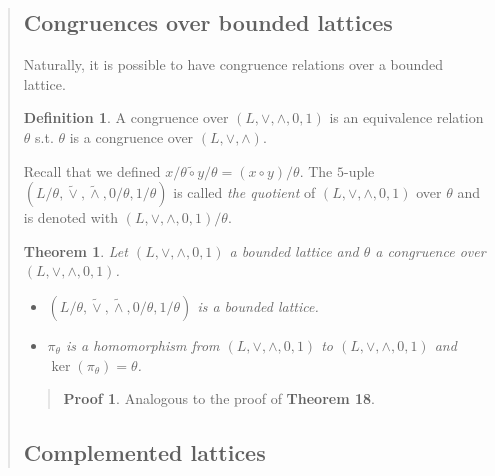 \documentclass[a4paper, 12pt]{article}
\newtheorem{theorem}{Theorem}
\theoremstyle{definition}
\theoremstyle{definition}
\theoremstyle{definition}
\newtheorem{definition}{Definition}
\newtheorem{pro}{Proof}
\DeclareMathOperator{\ker}{ker}
\begin{document}
\begin{quote}
\subsection{Congruences over bounded lattices}

Naturally, it is possible to have congruence relations 
over a bounded lattice. 

\begin{definition}
    A congruence over $(L, \lor, \land, 0, 1)$ is an equivalence relation 
    $\theta$ s.t. $\theta$ is a congruence over $(L, \lor, \land)$.
\end{definition}

Recall that we defined $x / \theta \widetilde{ \circ } y / \theta = (x \circ y)
/ \theta $. The $5$-uple $(L / \theta, \widetilde{\lor}, \widetilde{ \land}, 0 / \theta, 1/
\theta)$ is called \textit{the quotient} of $(L, \lor, \land, 0, 1)$ over
$\theta$ and is denoted with $(L, \lor, \land, 0, 1) / \theta$.


\begin{theorem}
    Let $(L, \lor, \land, 0, 1)$ a bounded lattice and $\theta$ a congruence 
    over $(L, \lor, \land, 0, 1)$.

    \begin{itemize}
        \item $(L / \theta, \widetilde{\lor}, \widetilde{ \land}, 0 / \theta, 1/ \theta)$ is a bounded lattice. 
        \item $\pi_\theta$ is a homomorphism from $(L, \lor, \land, 0, 1)$ to 
            $(L, \lor, \land, 0, 1)$ and $\ker(\pi_\theta) = \theta$.
    \end{itemize}
\end{theorem}

\small
\begin{quote}

\begin{pro}
    Analogous to the proof of \textbf{Theorem 18}.
\end{pro}

\end{quote}
\normalsize

\subsection{Complemented lattices}


\end{quote}
\end{document}
